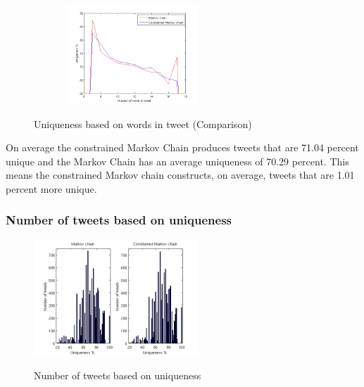 \documentclass[a4paper,12pt]{article}
\begin{document}
 \begin{figure}[h!]
   \hfill
   \begin{center}
  	{\includegraphics[width=280, height = 140]{UniqByNumWordsTweet2.png}}
  \end{center}
  \hfill
  \caption{Uniqueness based on words in tweet (Comparison)}
 \end{figure}
 
 On average the constrained Markov Chain produces tweets that are 71.04 percent unique and the Markov Chain has an average uniqueness of 70.29 percent. This means the constrained Markov chain constructs, on average, tweets that are 1.01 percent more unique.

\newpage
\subsubsection{Number of tweets based on uniqueness}

\begin{figure}[h!]
  \hfill
  {\includegraphics[width=1\linewidth, height = 165]{NumTweetsByUniq.png}}
  \caption{Number of tweets based on uniqueness}
 \end{figure}
 
\end{document}
